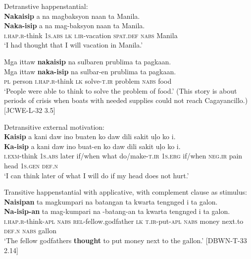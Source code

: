 \ea
Detranstive happenstantial: \\
\textbf{Nakaisip}  a  na  magbaksyon  naan  ta  Manila. \\\smallskip
\gll \textbf{Naka-isip}  a  na  mag-baksyon  naan  ta  Manila. \\
\textsc{i.hap.r}-think  1\textsc{s.abs}  \textsc{lk}  \textsc{i.ir}-vacation  \textsc{spat.def}  \textsc{nabs}  Manila \\
\glt ‘I had thought that I will vacation in Manila.’
\z

\ea
Mga  ittaw  \textbf{nakaisip}   na  sulbaren  prublima  ta  pagkaan. \\\smallskip
\gll Mga  ittaw  \textbf{naka-isip}   na  sulbar-en  prublima  ta  pagkaan. \\
\textsc{pl}   person  \textsc{i.hap.r}-think  \textsc{lk}  solve-\textsc{t.ir}  problem  \textsc{nabs}  food \\
\glt ‘People were able to think to solve the problem of food.’ (This story is about periods of crisis when boats with needed supplies could not reach Cagayancillo.) [JCWE-L-32 3.5]
\z

\ea
Detransitive external motivation: \\
\textbf{Kaisip}  a  kani  daw  ino  buaten  ko daw  dili  sakit  uļo  ko  i. \\\smallskip
\gll \textbf{Ka-isip}  a  kani  daw  ino  buat-en  ko daw  dili  sakit  uļo  ko  i. \\
\textsc{i.exm}-think  1\textsc{s.abs}  later  if/when  what  do/make-\textsc{t.ir}  1\textsc{s.erg}
if/when  \textsc{neg.ir}  pain  head  1\textsc{s.gen}  \textsc{def.n} \\
\glt `I can think later of what I will do if my head does not hurt.’
\z

\newpage
\ea
Transitive happenstantial with applicative, with complement clause as stimulus: \\
\textbf{Naisipan}  ta  magkumpari  na  batangan  ta  kwarta tengnged  i  ta  galon. \\\smallskip
\gll \textbf{Na-isip-an}  ta  mag-kumpari  na  \emptyset{}-batang-an  ta  kwarta tengnged  i  ta  galon. \\
\textsc{i.hap.r}-think-\textsc{apl}  \textsc{nabs}  \textsc{rel}-fellow.godfather  \textsc{lk}  \textsc{t.ir}-put-\textsc{apl}  \textsc{nabs}  money
next.to  \textsc{def.n}  \textsc{nabs}  gallon \\
\glt `The fellow godfathers \textbf{thought} to put money next to the gallon.’ [DBWN-T-33 2.14]
\z


